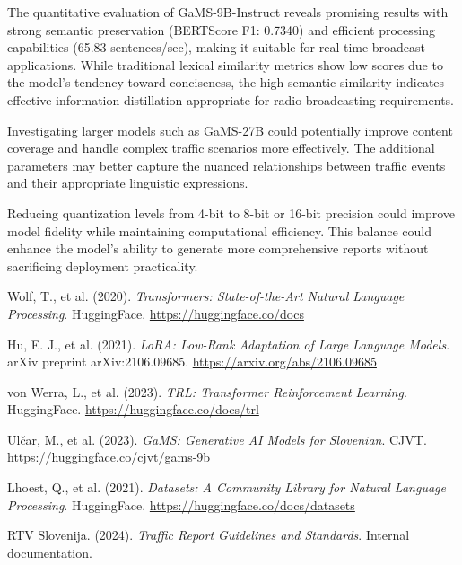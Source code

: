 \documentclass[fleqn,moreauthors,10pt]{ds_report}
\begin{document}
The quantitative evaluation of GaMS-9B-Instruct reveals promising results with strong semantic preservation (BERTScore F1: 0.7340) and efficient processing capabilities (65.83 sentences/sec), making it suitable for real-time broadcast applications. While traditional lexical similarity metrics show low scores due to the model's tendency toward conciseness, the high semantic similarity indicates effective information distillation appropriate for radio broadcasting requirements.

Investigating larger models such as GaMS-27B could potentially improve content coverage and handle complex traffic scenarios more effectively. The additional parameters may better capture the nuanced relationships between traffic events and their appropriate linguistic expressions.

Reducing quantization levels from 4-bit to 8-bit or 16-bit precision could improve model fidelity while maintaining computational efficiency. This balance could enhance the model's ability to generate more comprehensive reports without sacrificing deployment practicality.


\begin{thebibliography}{9}

Wolf, T., et al. (2020).
\textit{Transformers: State-of-the-Art Natural Language Processing}.
HuggingFace.
\url{https://huggingface.co/docs}

Hu, E. J., et al. (2021).
\textit{LoRA: Low-Rank Adaptation of Large Language Models}.
arXiv preprint arXiv:2106.09685.
\url{https://arxiv.org/abs/2106.09685}

von Werra, L., et al. (2023).
\textit{TRL: Transformer Reinforcement Learning}.
HuggingFace.
\url{https://huggingface.co/docs/trl}

Ulčar, M., et al. (2023).
\textit{GaMS: Generative AI Models for Slovenian}.
CJVT.
\url{https://huggingface.co/cjvt/gams-9b}

Lhoest, Q., et al. (2021).
\textit{Datasets: A Community Library for Natural Language Processing}.
HuggingFace.
\url{https://huggingface.co/docs/datasets}

RTV Slovenija. (2024).
\textit{Traffic Report Guidelines and Standards}.
Internal documentation.

\end{thebibliography}
\end{document}
